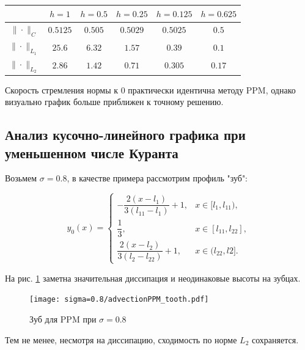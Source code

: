 \documentclass[12pt,a4paper]{article}
\newcommand{\picref}[1]{рис. \ref{#1}}
\begin{document}
    \begin{center}
        \begin{tabular}{ |c|c|c|c|c|c| } 
         \hline
        & $ h=1 $ &  $ h=0.5$ &  $ h=0.25 $ &  $ h=0.125 $ &  $ h=0.625 $ \\ 
         \hline 
         $\| \cdot \|_{C}$ & $0.5125$ & $0.505$ & $0.5029$ & $0.5025$ & $0.5$
         \\
         \hline
         $\| \cdot \|_{L_1}$ & $25.6$ & $6.32$ & $1.57$ & $0.39$ & $0.1$
         \\
         \hline
         $\| \cdot \|_{L_2}$ & $2.86$ & $1.42$ & $0.71$ & $0.305$ & $0.17$
         \\
         \hline
        \end{tabular}
    \end{center}

    Скорость стремления нормы к $ 0 $ практически идентична методу PPM, однако визуально график больше приближен к точному решению.

    \subsection{Анализ кусочно-линейного графика при уменьшенном числе Куранта }

    Возьмем $ \sigma = 0.8 $, в качестве примера рассмотрим профиль "зуб":

    \pagebreak

    \[
        y_0(x) = \begin{cases}
            -\dfrac{2(x-l_1)}{3(l_{11}-l_1)} + 1, & x \in [l_1, l_{11}), \\[0.7em]
               \dfrac{1}{3}, & x \in [l_{11}, l_{22}],
               \\[0.7em]
           \dfrac{2(x-l_{2})}{3(l_2 - l_{22})} + 1, & x \in (l_{22}, l2].
       \end{cases}   
    \]

    На \picref{fig:ppm_tooth_08} заметна значительная диссипация и неодинаковые высоты на зубцах. 

    \begin{figure}[h]
        \centering
        \texttt{[image: sigma=0.8/advectionPPM\_tooth.pdf]}
        \caption{Зуб для PPM при $ \sigma = 0.8 $}
        \label{fig:ppm_tooth_08}
    \end{figure}

    Тем не менее, несмотря на диссипацию, сходимость по норме $ L_2 $ сохраняется.
\end{document}
